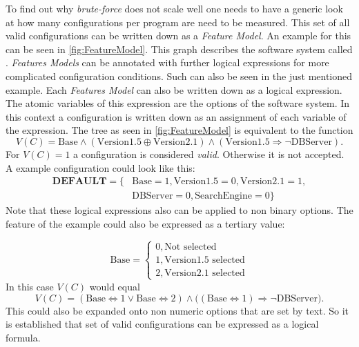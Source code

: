 To find out why \textit{brute-force} does not scale well one needs to have a generic look at how many configurations per program are need to be measured. This set of all valid configurations can be written down as a \textit{Feature Model}. An example for this can be seen in \cref{fig:FeatureModel}. This graph describes the software system called . \textit{Features Models} can be annotated with further logical expressions for more complicated configuration conditions. Such can also be seen in the just mentioned example. Each \textit{Features Model} can also be written down as a logical expression. The atomic variables of this expression are the options of the software system. In this context a configuration is written down as an assignment of each variable of the expression. The tree as seen in \cref{fig:FeatureModel} is equivalent to the function
\begin{equation*}
	V(C)= \text{Base} \land (\text{Version1.5} \oplus \text{Version2.1}) \land (\text{Version1.5} \Rightarrow \neg \text{DBServer}).%
\end{equation*}
For $V(C)=1$ a configuration is considered \textit{valid}. Otherwise it is not accepted.
A example configuration could look like this:
\begin{align*}
	\textbf{DEFAULT} =  \{&\text{Base} = 1, \text{Version1.5}=0, \text{Version2.1} = 1, \\
	&\text{DBServer} =0, \text{SearchEngine} =0 \}
\end{align*}
Note that these logical expressions also can be applied to non binary options. The feature  of the example could also be expressed as a tertiary value:

\begin{equation*}
	\text{Base} =  \begin{cases}
		0, \text{Not selected}\\
		1, \text{Version1.5 selected}\\
		2, \text{Version2.1 selected}
	\end{cases}
\end{equation*}
In this case $V(C)$ would equal
\begin{equation*}
		V(C)= (\text{Base} \Leftrightarrow 1 \lor \text{Base} \Leftrightarrow 2) \land \big((\text{Base} \Leftrightarrow 1) \Rightarrow \neg \text{DBServer}\big).
\end{equation*}
This could also be expanded onto non numeric options that are set by text. So it is established that set of valid configurations can be expressed as a logical formula.


